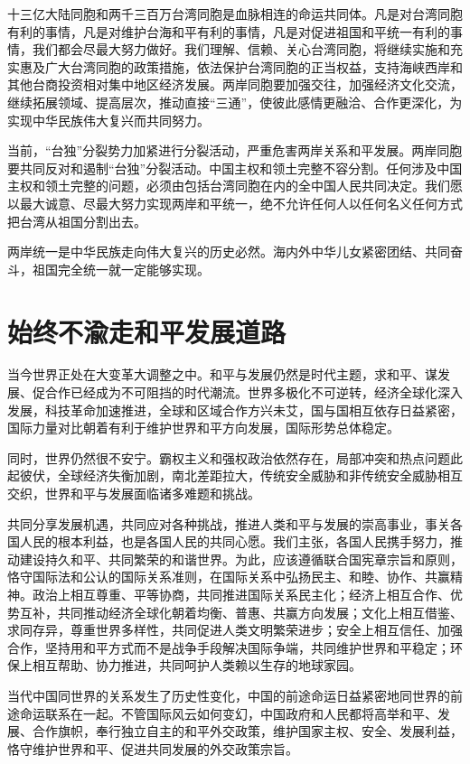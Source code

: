 十三亿大陆同胞和两千三百万台湾同胞是血脉相连的命运共同体。凡是对台湾同胞有利的事情，凡是对维护台海和平有利的事情，凡是对促进祖国和平统一有利的事情，我们都会尽最大努力做好。我们理解、信赖、关心台湾同胞，将继续实施和充实惠及广大台湾同胞的政策措施，依法保护台湾同胞的正当权益，支持海峡西岸和其他台商投资相对集中地区经济发展。两岸同胞要加强交往，加强经济文化交流，继续拓展领域、提高层次，推动直接“三通”，使彼此感情更融洽、合作更深化，为实现中华民族伟大复兴而共同努力。

当前，“台独”分裂势力加紧进行分裂活动，严重危害两岸关系和平发展。两岸同胞要共同反对和遏制“台独”分裂活动。中国主权和领土完整不容分割。任何涉及中国主权和领土完整的问题，必须由包括台湾同胞在内的全中国人民共同决定。我们愿以最大诚意、尽最大努力实现两岸和平统一，绝不允许任何人以任何名义任何方式把台湾从祖国分割出去。

两岸统一是中华民族走向伟大复兴的历史必然。海内外中华儿女紧密团结、共同奋斗，祖国完全统一就一定能够实现。

\section{始终不渝走和平发展道路}

当今世界正处在大变革大调整之中。和平与发展仍然是时代主题，求和平、谋发展、促合作已经成为不可阻挡的时代潮流。世界多极化不可逆转，经济全球化深入发展，科技革命加速推进，全球和区域合作方兴未艾，国与国相互依存日益紧密，国际力量对比朝着有利于维护世界和平方向发展，国际形势总体稳定。

同时，世界仍然很不安宁。霸权主义和强权政治依然存在，局部冲突和热点问题此起彼伏，全球经济失衡加剧，南北差距拉大，传统安全威胁和非传统安全威胁相互交织，世界和平与发展面临诸多难题和挑战。

共同分享发展机遇，共同应对各种挑战，推进人类和平与发展的崇高事业，事关各国人民的根本利益，也是各国人民的共同心愿。我们主张，各国人民携手努力，推动建设持久和平、共同繁荣的和谐世界。为此，应该遵循联合国宪章宗旨和原则，恪守国际法和公认的国际关系准则，在国际关系中弘扬民主、和睦、协作、共赢精神。政治上相互尊重、平等协商，共同推进国际关系民主化；经济上相互合作、优势互补，共同推动经济全球化朝着均衡、普惠、共赢方向发展；文化上相互借鉴、求同存异，尊重世界多样性，共同促进人类文明繁荣进步；安全上相互信任、加强合作，坚持用和平方式而不是战争手段解决国际争端，共同维护世界和平稳定；环保上相互帮助、协力推进，共同呵护人类赖以生存的地球家园。

当代中国同世界的关系发生了历史性变化，中国的前途命运日益紧密地同世界的前途命运联系在一起。不管国际风云如何变幻，中国政府和人民都将高举和平、发展、合作旗帜，奉行独立自主的和平外交政策，维护国家主权、安全、发展利益，恪守维护世界和平、促进共同发展的外交政策宗旨。

